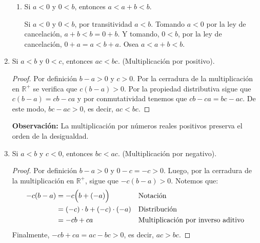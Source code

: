\documentclass[11pt]{article}
\newcommand{\R}{\mathbb{R}}
\begin{document}
\begin{enumerate}[label=\alph*)]
\begin{enumerate}[label=\roman*)]
        \item Si $a<0$ y $0<b$, entonces $a<a+b<b$.
        
        Si $a<0$ y $0<b$, por transitividad $a<b$. Tomando $a<0$ por la ley de cancelación, $a+b<b=0+b$. Y tomando, $0<b$, por la ley de cancelación, $0+a=a<b+a$. Osea $a<a+b<b$.
    \end{enumerate}

    \item Si $a<b$ y $0<c$, entonces $ac<bc$. (Multiplicación por positivo).
    
    \vspace{-1em}\begin{proof} 
        Por definición $b-a >0$ y $c >0$. Por la cerradura de la multiplicación en $\R^+$ se verifica que $c(b-a) >0$. Por la propiedad distributiva sigue que $c(b-a)=cb-ca$ y por conmutatividad tenemos que $cb-ca=bc-ac$. De este modo, $bc-ac >0$, es decir, $ac<bc$.    
    \end{proof} \vspace{-1em}

    \textbf{Observación:} La multiplicación por números reales positivos preserva el orden de la desigualdad.

    \item Si $a<b$ y $c<0$, entonces $bc<ac$. (Multiplicación por negativo).
    
    \vspace{-1em}\begin{proof} 
    Por definición $b-a >0$ y $0 - c=-c >0$. Luego, por la cerradura de la multiplicación en $\R^+$, sigue que $-c(b-a) >0$. Notemos que:
    \begin{align*}
    -c(b-a) &= -c \Bigl( b + (-a) \Bigr) && \text{Notación}\\
    &= (-c) \cdot b + (-c) \cdot (-a) && \text{Distribución}\\
    &= -cb +ca && \text{Multiplicación por inverso aditivo}
    \end{align*}
    Finalmente, $-cb +ca=ac - bc >0$, es decir, $ac>bc$.    
    \end{proof} \vspace{-1em}


\end{enumerate}
\end{document}
